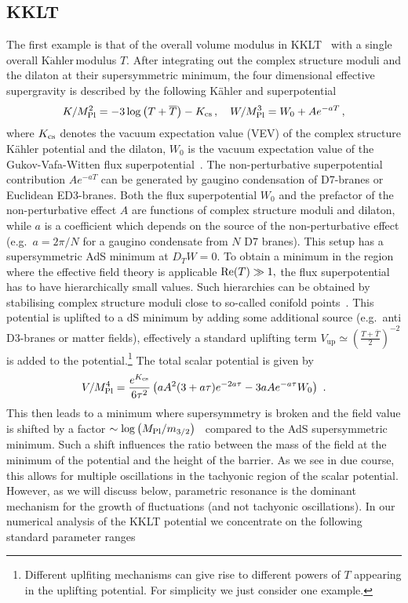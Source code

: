 \documentclass[12pt]{article}
\newcommand{\Kahler}{\ensuremath{\text{K}\ddot{\text{a}}\text{hler}\,}}
\begin{document}
\subsection{KKLT}
\label{sec:KKLT}
The first example is that of the overall volume modulus in KKLT~\cite{Kachru:2003aw} with a single overall \Kahler modulus $T.$ After integrating out the complex structure moduli and the dilaton at their supersymmetric minimum, the four dimensional effective supergravity is described by the following K\"ahler and superpotential  
\begin{equation}
K/M^2_{\rm Pl} = -3 \log\left(T + \overline{T}\right) - K_{\rm cs}\,, \quad W/M^3_{\rm Pl} = W_0 + A e^{-a T}\,,
\end{equation}
where $K_{\rm cs}$ denotes the vacuum expectation value (VEV) of the complex structure K\"ahler potential and the dilaton, $W_0$ is the vacuum expectation value of the Gukov-Vafa-Witten flux superpotential~\cite{Gukov:1999ya}. The non-perturbative superpotential contribution $A e^{-aT}$ can be generated by gaugino condensation of D7-branes or Euclidean ED3-branes. Both the flux superpotential $W_0$ and the prefactor of the non-perturbative effect $A$ are functions of complex structure moduli and dilaton, while $a$ is a coefficient which depends on the source of the non-perturbative effect (e.g.~$a=2\pi/N$ for a gaugino condensate from $N$ D7 branes). This setup has a supersymmetric AdS minimum at $D_T W=0.$ To obtain a minimum in the region where the effective field theory is applicable ${\rm Re}(T)\gg 1,$ the flux superpotential has to have hierarchically small values. Such hierarchies can be obtained by stabilising complex structure moduli close to so-called conifold points~\cite{Giddings:2001yu}. This potential is uplifted to a dS minimum by adding some additional source (e.g.~anti D3-branes or matter fields), effectively a standard uplifting term $V_{\text{up}} \simeq \left(\frac{T + \overline{T}}{2}\right)^{-2}$ is added to the potential.\footnote{Different uplfiting mechanisms can give rise to different powers of $T$ appearing in the uplifting potential. For simplicity we just consider one example.} The total scalar potential is given by
\begin{equation}
V/M^4_{\rm Pl} = \frac{e^{K_{\rm cs}}}{6\tau^2}\left(a A^2(3+a\tau)e^{-2a\tau}-3 a A e^{-a\tau}W_0\right)~.
\label{eq:potential_KKLT_tau}
\end{equation}
This then leads to a minimum where supersymmetry is broken and the field value is shifted by a factor $\sim \log\left(M_{\rm Pl}/m_{3/2}\right)$~\cite{LoaizaBrito:2005fa} compared to the AdS supersymmetric minimum. Such a shift influences the ratio between the mass of the field at the minimum of the potential and the height of the barrier. As we see in due course, this allows for multiple oscillations in the tachyonic region of the scalar potential. However, as we will discuss below, parametric resonance is the dominant mechanism for the growth of fluctuations (and not tachyonic oscillations). In our numerical analysis of the KKLT potential we concentrate on the following standard parameter ranges
\end{document}
